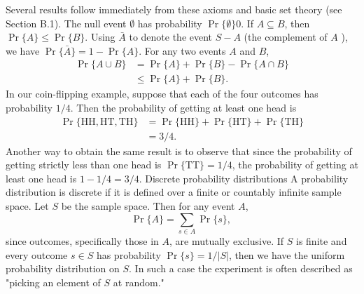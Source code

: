 \documentclass[lang=cn,newtx,10pt,scheme=chinese]{elegantbook}
\begin{document}
Several results follow immediately from these axioms and basic set theory (see Section B.1). The null event $\emptyset$ has probability $\operatorname{Pr}\{\emptyset\} 0$. If $A \subseteq B$, then $\operatorname{Pr}\{A\} \leq \operatorname{Pr}\{B\}$. Using $\bar{A}$ to denote the event $S-A$ (the complement of $A$ ), we have $\operatorname{Pr}\{\bar{A}\}=1-\operatorname{Pr}\{A\}$. For any two events $A$ and $B$,
$$
\begin{aligned}
\operatorname{Pr}\{A \cup B\} & =\operatorname{Pr}\{A\}+\operatorname{Pr}\{B\}-\operatorname{Pr}\{A \cap B\} \\
& \leq \operatorname{Pr}\{A\}+\operatorname{Pr}\{B\} .
\end{aligned}
$$
In our coin-flipping example, suppose that each of the four outcomes has probability $1 / 4$. Then the probability of getting at least one head is
$$
\begin{aligned}
\operatorname{Pr}\{\mathrm{HH}, \mathrm{HT}, \mathrm{TH}\} & =\operatorname{Pr}\{\mathrm{HH}\}+\operatorname{Pr}\{\mathrm{HT}\}+\operatorname{Pr}\{\mathrm{TH}\} \\
& =3 / 4 .
\end{aligned}
$$
Another way to obtain the same result is to observe that since the probability of getting strictly less than one head is $\operatorname{Pr}\{\mathrm{TT}\}=1 / 4$, the probability of getting at least one head is $1-1 / 4=3 / 4$.
Discrete probability distributions
A probability distribution is discrete if it is defined over a finite or countably infinite sample space. Let $S$ be the sample space. Then for any event $A$,
$$
\operatorname{Pr}\{A\}=\sum_{s \in A} \operatorname{Pr}\{s\} \text {, }
$$
since outcomes, specifically those in $A$, are mutually exclusive. If $S$ is finite and every outcome $s \in S$ has probability $\operatorname{Pr}\{s\}=1 /|S|$, then we have the uniform probability distribution on $S$. In such a case the experiment is often described as "picking an element of $S$ at random."
\end{document}
